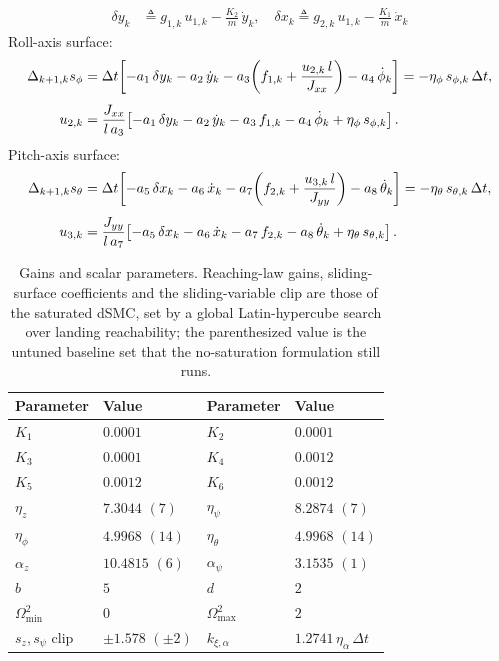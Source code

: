 \documentclass[conf]{new-aiaa}
\begin{document}
\begin{samepage}
\begin{align}
\end{align}
\begin{align}
\delta y_k &\triangleq g_{1,k}\,u_{1,k} - \frac{K_2}{m}\,\dot y_k, \quad
\delta x_k \triangleq g_{2,k}\,u_{1,k} - \frac{K_1}{m}\,\dot x_k
\end{align}
Roll-axis surface:
\begin{align}
\Delta_{k+1,k} s_{\phi}
&= \Delta t\!\left[ - a_1\,\delta y_k - a_2\,\dot y_k - a_3\!\left(f_{1,k} + \frac{u_{2,k}\,l}{J_{xx}}\right) - a_4\,\dot\phi_k \right]
= -\eta_\phi\,s_{\phi,k}\,\Delta t, \notag \\[4pt]
u_{2,k}
&= \frac{J_{xx}}{l\,a_3}\!\left[ - a_1\,\delta y_k - a_2\,\dot y_k - a_3\,f_{1,k} - a_4\,\dot\phi_k + \eta_\phi\,s_{\phi,k} \right].
\end{align}
Pitch-axis surface:
\begin{align}
\Delta_{k+1,k} s_{\theta}
&= \Delta t\!\left[ - a_5\,\delta x_k - a_6\,\dot x_k - a_7\!\left(f_{2,k} + \frac{u_{3,k}\,l}{J_{yy}}\right) - a_8\,\dot\theta_k \right]
= -\eta_\theta\,s_{\theta,k}\,\Delta t, \notag \\[4pt]
u_{3,k}
&= \frac{J_{yy}}{l\,a_7}\!\left[ - a_5\,\delta x_k - a_6\,\dot x_k - a_7\,f_{2,k} - a_8\,\dot\theta_k + \eta_\theta\,s_{\theta,k} \right].
\end{align}
\endgroup
\end{samepage}

\begingroup
\footnotesize
\setlength{\tabcolsep}{4pt}
\begin{table}[t]
\vspace*{25pt}
\centering
\caption{Gains and scalar parameters. Reaching-law gains, sliding-surface coefficients and the sliding-variable clip are those of the saturated dSMC, set by a global Latin-hypercube search over landing reachability; the parenthesized value is the untuned baseline set that the no-saturation formulation still runs.}
\label{tab:gains-scalars}
\begin{tabular}{ll@{\hskip 18pt}ll}
\toprule
Parameter & Value & Parameter & Value \\
\midrule
$K_1$ & $0.0001$ & $K_2$ & $0.0001$ \\
$K_3$ & $0.0001$ & $K_4$ & $0.0012$ \\
$K_5$ & $0.0012$ & $K_6$ & $0.0012$ \\
$\eta_z$ & $7.3044$ $(7)$ & $\eta_\psi$ & $8.2874$ $(7)$ \\
$\eta_\phi$ & $4.9968$ $(14)$ & $\eta_\theta$ & $4.9968$ $(14)$ \\
$\alpha_z$ & $10.4815$ $(6)$ & $\alpha_\psi$ & $3.1535$ $(1)$ \\
$b$ & $5$ & $d$ & $2$ \\
$\Omega^2_{\min}$ & $0$ & $\Omega^2_{\max}$ & $2$ \\
$s_z, s_\psi$ clip & $\pm 1.578$ $(\pm 2)$ & $k_{\xi,\alpha}$ & $1.2741\,\eta_\alpha\,\Delta t$ \\
\bottomrule
\end{tabular}
\end{table}
\endgroup
\end{document}
